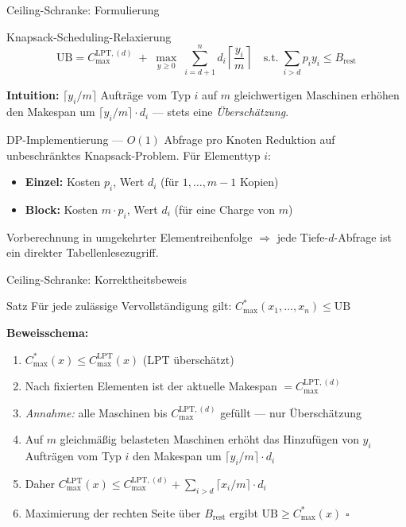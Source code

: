 \documentclass[fleqn,11pt,aspectratio=43]{beamer}
\newcommand{\Copt}{C_{\max}^{*}}
\newcommand{\Clpt}{C_{\max}^{\mathrm{LPT}}}
\newcommand{\Brem}{B_{\mathrm{rest}}}
\newcommand{\UB}{\mathrm{UB}}
\begin{document}
\begin{frame}[shrink=15]{Ceiling-Schranke: Formulierung}
  \begin{block}{Knapsack-Scheduling-Relaxierung}
    \vspace{-0.3em}
    \[\UB = C_{\max}^{\mathrm{LPT},(d)}
      \;+\;
      \max_{y\geq 0}\;\sum_{i=d+1}^{n}d_i\!\left\lceil\frac{y_i}{m}\right\rceil
      \quad\text{s.t.}\;\sum_{i>d}p_iy_i\leq\Brem\]
    \vspace{-0.3em}
  \end{block}
  \textbf{Intuition:} $\lceil y_i/m\rceil$ Aufträge vom Typ $i$ auf $m$ gleichwertigen Maschinen erhöhen den Makespan um
  $\lceil y_i/m\rceil\cdot d_i$ — stets eine \emph{Überschätzung}.
  \begin{block}{DP-Implementierung — $O(1)$ Abfrage pro Knoten}
    \small Reduktion auf unbeschränktes Knapsack-Problem. Für Elementtyp $i$:
    \begin{itemize}\small
      \item \textbf{Einzel:} Kosten $p_i$, Wert $d_i$ (für $1,\ldots,m{-}1$ Kopien)
      \item \textbf{Block:} Kosten $m\cdot p_i$, Wert $d_i$ (für eine Charge von $m$)
    \end{itemize}
    Vorberechnung in umgekehrter Elementreihenfolge $\Rightarrow$ jede Tiefe-$d$-Abfrage ist ein direkter Tabellenlesezugriff.
  \end{block}
\end{frame}

\begin{frame}[shrink=18]{Ceiling-Schranke: Korrektheitsbeweis}
  \begin{block}{Satz}
    Für jede zulässige Vervollständigung gilt: $\Copt(x_1,\ldots,x_n)\leq\UB$
  \end{block}
  \textbf{Beweisschema:}
  \begin{enumerate}
    \item $\Copt(x)\leq\Clpt(x)$ (LPT überschätzt)
    \item Nach fixierten Elementen ist der aktuelle Makespan $= C_{\max}^{\mathrm{LPT},(d)}$
    \item \emph{Annahme:} alle Maschinen bis $C_{\max}^{\mathrm{LPT},(d)}$ gefüllt — nur Überschätzung
    \item Auf $m$ gleichmäßig belasteten Maschinen erhöht das Hinzufügen von $y_i$ Aufträgen vom Typ $i$ den Makespan um
          $\lceil y_i/m\rceil\cdot d_i$
    \item Daher $\Clpt(x)\leq C_{\max}^{\mathrm{LPT},(d)}+\sum_{i>d}\lceil x_i/m\rceil\cdot d_i$
    \item Maximierung der rechten Seite über $\Brem$ ergibt $\UB\geq\Copt(x)$ \hfill$\square$
  \end{enumerate}
\end{frame}
\end{document}
